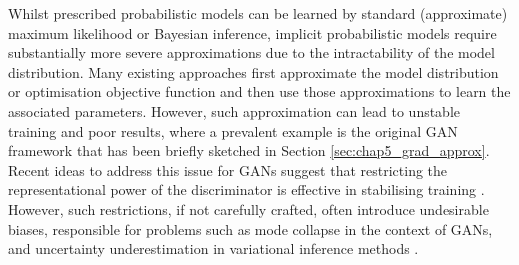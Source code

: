 
Whilst prescribed probabilistic models can be learned by standard (approximate) maximum likelihood or Bayesian inference, implicit probabilistic models require substantially more severe approximations due to the intractability of the model distribution. Many existing approaches first approximate the model distribution or optimisation objective function and then use those approximations to learn the associated parameters. However, such approximation can lead to unstable training and poor results, where a prevalent example is the original GAN framework \citep{goodfellow:gan2014} that has been briefly sketched in Section \ref{sec:chap5_grad_approx}.
%
Recent ideas to address this issue for GANs suggest that restricting the representational power of the discriminator is effective in stabilising training \citep[e.g. see][]{arjovsky:wgan2017, kodali:dragan2017}. However, such restrictions, if not carefully crafted, often introduce undesirable biases, responsible for problems such as mode collapse in the context of GANs, and uncertainty underestimation in variational inference methods \citep{turner:two_problems2011}.


